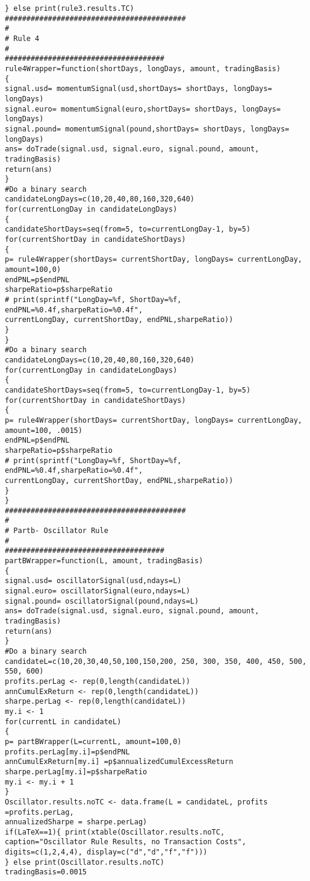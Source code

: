 \begin{small}
\begin{lstlisting}
} else print(rule3.results.TC)
##########################################
#
# Rule 4
#
#####################################
rule4Wrapper=function(shortDays, longDays, amount, tradingBasis)
{
signal.usd= momentumSignal(usd,shortDays= shortDays, longDays= longDays)
signal.euro= momentumSignal(euro,shortDays= shortDays, longDays= longDays)
signal.pound= momentumSignal(pound,shortDays= shortDays, longDays= longDays)
ans= doTrade(signal.usd, signal.euro, signal.pound, amount, tradingBasis)
return(ans)
}
#Do a binary search
candidateLongDays=c(10,20,40,80,160,320,640)
for(currentLongDay in candidateLongDays)
{
candidateShortDays=seq(from=5, to=currentLongDay-1, by=5)
for(currentShortDay in candidateShortDays)
{
p= rule4Wrapper(shortDays= currentShortDay, longDays= currentLongDay, 
amount=100,0)
endPNL=p$endPNL
sharpeRatio=p$sharpeRatio
# print(sprintf("LongDay=%f, ShortDay=%f, endPNL=%0.4f,sharpeRatio=%0.4f", 
currentLongDay, currentShortDay, endPNL,sharpeRatio))
}
}
#Do a binary search
candidateLongDays=c(10,20,40,80,160,320,640)
for(currentLongDay in candidateLongDays)
{
candidateShortDays=seq(from=5, to=currentLongDay-1, by=5)
for(currentShortDay in candidateShortDays)
{
p= rule4Wrapper(shortDays= currentShortDay, longDays= currentLongDay, 
amount=100, .0015)
endPNL=p$endPNL
sharpeRatio=p$sharpeRatio
# print(sprintf("LongDay=%f, ShortDay=%f, endPNL=%0.4f,sharpeRatio=%0.4f", 
currentLongDay, currentShortDay, endPNL,sharpeRatio))
}
}
##########################################
#
# Partb- Oscillator Rule
#
#####################################
partBWrapper=function(L, amount, tradingBasis)
{
signal.usd= oscillatorSignal(usd,ndays=L)
signal.euro= oscillatorSignal(euro,ndays=L)
signal.pound= oscillatorSignal(pound,ndays=L)
ans= doTrade(signal.usd, signal.euro, signal.pound, amount, tradingBasis)
return(ans)
}
#Do a binary search
candidateL=c(10,20,30,40,50,100,150,200, 250, 300, 350, 400, 450, 500, 550, 600)
profits.perLag <- rep(0,length(candidateL))
annCumulExReturn <- rep(0,length(candidateL))
sharpe.perLag <- rep(0,length(candidateL))
my.i <- 1
for(currentL in candidateL)
{
p= partBWrapper(L=currentL, amount=100,0)
profits.perLag[my.i]=p$endPNL
annCumulExReturn[my.i] =p$annualizedCumulExcessReturn
sharpe.perLag[my.i]=p$sharpeRatio
my.i <- my.i + 1
}
Oscillator.results.noTC <- data.frame(L = candidateL, profits =profits.perLag,
annualizedSharpe = sharpe.perLag)
if(LaTeX==1){ print(xtable(Oscillator.results.noTC,
caption="Oscillator Rule Results, no Transaction Costs",
digits=c(1,2,4,4), display=c("d","d","f","f")))
} else print(Oscillator.results.noTC)
tradingBasis=0.0015

\end{lstlisting}
\end{small}
